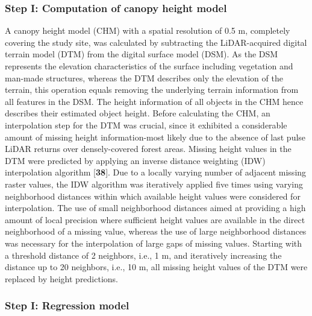 \subsubsection{Step I: Computation of canopy height model}
\label{sec:step1}

A canopy height model (CHM) with a spatial resolution of 0.5 m, completely covering the study site, was calculated by subtracting the LiDAR-acquired digital terrain model (DTM) from the digital surface model (DSM). As the DSM represents the elevation characteristics of the surface including vegetation and man-made structures, whereas the DTM describes only the elevation of the terrain, this operation equals removing the underlying terrain information from all features in the DSM. The height information of all objects in the CHM hence describes their estimated object height. Before calculating the CHM, an interpolation step for the DTM was crucial, since it exhibited a considerable amount of missing height information-most likely due to the absence of last pulse LiDAR returns over densely-covered forest areas. Missing height values in the DTM were predicted by applying an inverse distance weighting (IDW) interpolation algorithm [\textbf{38}]. Due to a locally varying number of adjacent missing raster values, the IDW algorithm was iteratively applied five times using varying neighborhood distances within which available height values were considered for interpolation. The use of small neighborhood distances aimed at providing a high amount of local precision where sufficient height values are available in the direct neighborhood of a missing value, whereas the use of large neighborhood distances was necessary for the interpolation of large gaps of missing values. Starting with a threshold distance of 2 neighbors, i.e., 1 m, and iteratively increasing the distance up to 20 neighbors, i.e., 10 m, all missing height values of the DTM were replaced by height predictions.

\subsubsection{Step I: Regression model}
\label{sec:step1regmod}

